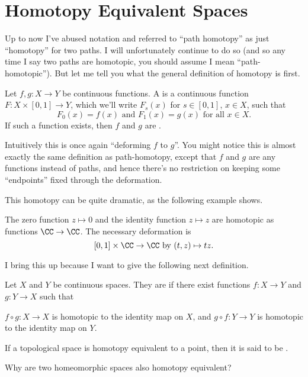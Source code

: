 \section{Homotopy Equivalent Spaces}
Up to now I've abused notation and referred to ``path homotopy'' as just ``homotopy'' for two paths.
I will unfortunately continue to do so (and so any time I say two paths are homotopic, you should assume I mean ``path-homotopic'').
But let me tell you what the general definition of homotopy is first.
\begin{definition}
	Let $f,g : X \to Y$ be continuous functions.
	A  is a continuous function $F : X \times [0,1] \to Y$,
	which we'll write $F_s(x)$ for $s \in [0,1]$, $x \in X$, such that 
	\[ F_0(x) = f(x) \text{ and } F_1(x) = g(x) \text{ for all $x \in X$.} \]
	If such a function exists, then $f$ and $g$ are .
\end{definition}
Intuitively this is once again ``deforming $f$ to $g$''.
You might notice this is almost exactly the same definition as path-homotopy,
except that $f$ and $g$ are any functions instead of paths, and hence
there's no restriction on keeping some ``endpoints'' fixed through the deformation.

This homotopy can be quite dramatic, as the following example shows.
\begin{example}
	The zero function $z \mapsto 0$ and the identity function $z \mapsto z$
	are homotopic as functions $\CC \to \CC$.
	The necessary deformation is
	\[ [0,1] \times \CC \to \CC \text{ by } (t,z) \mapsto tz. \]
\end{example}

I bring this up because I want to give the following next definition.
\begin{definition}
	Let $X$ and $Y$ be continuous spaces.
	They are  if there exist
	functions $f : X \to Y$ and $g : Y \to X$ such that
	\begin{enumerate}[(i)]
		\ii $f \circ g : X \to X$ is homotopic to the identity map on $X$, and
		\ii $g \circ f : Y \to Y$ is homotopic to the identity map on $Y$.
	\end{enumerate}
	If a topological space is homotopy equivalent to a point,
	then it is said to be .
\end{definition}
\begin{ques}
	Why are two homeomorphic spaces also homotopy equivalent?
\end{ques}

